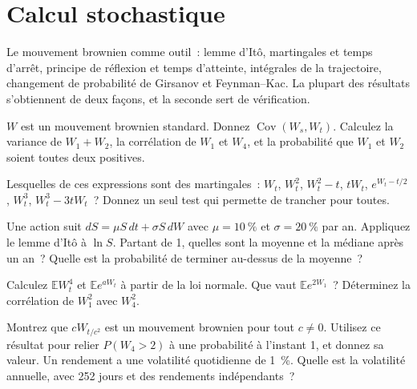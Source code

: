 \chapter{Calcul stochastique}\label{ch:iv1:stochastic-calculus}

\begin{ivtrains}
Le mouvement brownien comme outil~: lemme d'Itô, martingales et temps d'arrêt, principe de réflexion et temps d'atteinte, intégrales de la trajectoire, changement de probabilité de Girsanov et Feynman--Kac. La plupart des résultats s'obtiennent de deux façons, et la seconde sert de vérification.
\end{ivtrains}

\begin{question}\label{iq:iv1:stochastic-calculus:1}
$W$ est un mouvement brownien standard. Donnez $\operatorname{Cov}(W_s, W_t)$. Calculez la variance de $W_1 + W_2$, la corrélation de $W_1$ et $W_4$, et la probabilité que $W_1$ et $W_2$ soient toutes deux positives.
\end{question}

\begin{question}\label{iq:iv1:stochastic-calculus:2}
Lesquelles de ces expressions sont des martingales~: $W_t$, $W_t^2$, $W_t^2 - t$, $tW_t$, $e^{W_t - t/2}$, $W_t^3$, $W_t^3 - 3tW_t$~? Donnez un seul test qui permette de trancher pour toutes.
\end{question}

\begin{question}\label{iq:iv1:stochastic-calculus:3}
Une action suit $dS = \mu S\,dt + \sigma S\,dW$ avec $\mu = 10~\%$ et $\sigma = 20~\%$ par an. Appliquez le lemme d'Itô à $\ln S$. Partant de 1, quelles sont la moyenne et la médiane après un an~? Quelle est la probabilité de terminer au-dessus de la moyenne~?
\end{question}

\begin{question}\label{iq:iv1:stochastic-calculus:4}
Calculez $\mathbb{E}W_t^4$ et $\mathbb{E}e^{aW_t}$ à partir de la loi normale. Que vaut $\mathbb{E}e^{2W_1}$~? Déterminez la corrélation de $W_1^2$ avec $W_4^2$.
\end{question}

\begin{question}\label{iq:iv1:stochastic-calculus:5}
Montrez que $cW_{t/c^2}$ est un mouvement brownien pour tout $c \ne 0$. Utilisez ce résultat pour relier $P(W_4 > 2)$ à une probabilité à l'instant 1, et donnez sa valeur. Un rendement a une volatilité quotidienne de 1~\%. Quelle est la volatilité annuelle, avec 252 jours et des rendements indépendants~?
\end{question}

